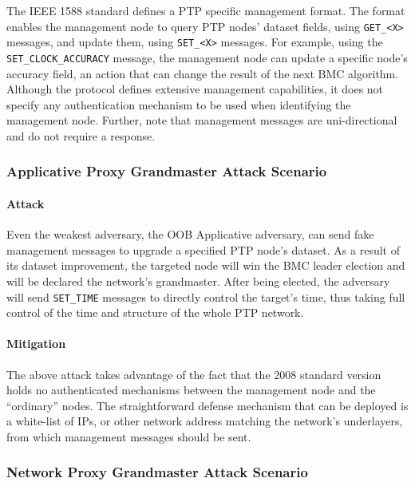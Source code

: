 \documentclass[11pt]{article}
\begin{document}
The IEEE 1588 standard \cite{standard} defines a PTP specific management format. The format enables the management node to query PTP nodes' dataset fields, using \texttt{GET_<X>} messages, and update them, using \texttt{SET_<X>} messages. For example, using the \texttt{SET_CLOCK_ACCURACY} message, the management node can update a specific node's accuracy field, an action that can change the result of the next BMC algorithm. Although the protocol defines extensive management capabilities, it does not specify any authentication mechanism to be used when identifying the management node. Further, note that management messages are uni-directional and do not require a response.



\subsubsection{Applicative Proxy Grandmaster Attack Scenario}\label{manag:scenrio1}

\paragraph{Attack}

Even the weakest adversary, the OOB Applicative adversary, can send fake management messages to upgrade a specified PTP node's dataset. As a result of its dataset improvement, the targeted node will win the BMC leader election and will be declared the network's grandmaster. After being elected, the adversary will send \texttt{SET_TIME} messages to directly control the target's time, thus taking full control of the time and structure of the whole PTP network.



\paragraph{Mitigation}\label{manag:socioeconomic}

The above attack takes advantage of the fact that the 2008 standard version holds no authenticated mechanisms between the management node and the ``ordinary'' nodes. The straightforward defense mechanism that can be deployed is a white-list of IPs, or other network address matching the network's underlayers, from which management messages should be sent.



\subsubsection{Network Proxy Grandmaster Attack Scenario}\label{manag:scenrio2}
\end{document}
